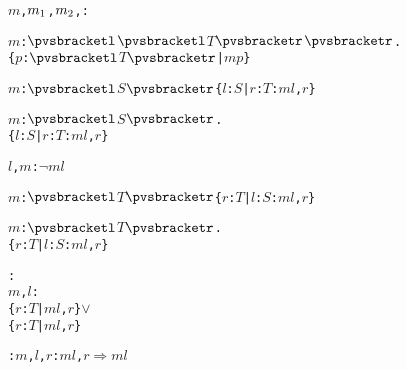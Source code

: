 \begin{alltt}
  \(m\), \(m\sb{1}\), \(m\sb{2}\), :  \vspace*{\pvsdeclspacing}

  \pvsid{(}\(m\)\pvsid{)}: \({\pvsbracketl}\)\({\pvsbracketl}\)\(T\)\({\pvsbracketr}\)\({\pvsbracketr}\). \pvskey{=}
      \{\(p\): \({\pvsbracketl}\)\(T\)\({\pvsbracketr}\) | \(m\)\pvsid{(}\(p\)\pvsid{)}\}\vspace*{\pvsdeclspacing}

  \pvsid{(}\(m\)\pvsid{)}: \({\pvsbracketl}\)\(S\)\({\pvsbracketr}\) \pvskey{=} \{\(l\): \(S\) |  \pvsid{(}\(r\): \(T\)\pvsid{)}: \(m\)\pvsid{(}\(l\), \(r\)\pvsid{)}\}\vspace*{\pvsdeclspacing}

  \pvsid{(}\(m\)\pvsid{)}: \({\pvsbracketl}\)\(S\)\({\pvsbracketr}\). \pvskey{=}
      \{\(l\): \(S\) |  \pvsid{(}\(r\): \(T\)\pvsid{)}: \(m\)\pvsid{(}\(l\), \(r\)\pvsid{)}\}\vspace*{\pvsdeclspacing}

  \pvsid{(}\(l\), \(m\)\pvsid{)}:  \pvskey{=} \(\neg\) \pvsid{(}\pvsid{(}\(m\)\pvsid{)}\pvsid{(}\(l\)\pvsid{)}\pvsid{)}\vspace*{\pvsdeclspacing}

  \pvsid{(}\(m\)\pvsid{)}: \({\pvsbracketl}\)\(T\)\({\pvsbracketr}\) \pvskey{=} \{\(r\): \(T\) |  \pvsid{(}\(l\): \(S\)\pvsid{)}: \(m\)\pvsid{(}\(l\), \(r\)\pvsid{)}\}\vspace*{\pvsdeclspacing}

  \pvsid{(}\(m\)\pvsid{)}: \({\pvsbracketl}\)\(T\)\({\pvsbracketr}\). \pvskey{=}
      \{\(r\): \(T\) |  \pvsid{(}\(l\): \(S\)\pvsid{)}: \(m\)\pvsid{(}\(l\), \(r\)\pvsid{)}\}\vspace*{\pvsdeclspacing}

  : 
     \pvsid{(}\(m\), \(l\)\pvsid{)}:
      \pvsid{(}\{\(r\): \(T\) | \(m\)\pvsid{(}\(l\), \(r\)\pvsid{)}\}\pvsid{)} \(\vee\)
       \pvsid{(}\{\(r\): \(T\) | \(m\)\pvsid{(}\(l\), \(r\)\pvsid{)}\}\pvsid{)}\vspace*{\pvsdeclspacing}

  :   \pvsid{(}\(m\), \(l\), \(r\)\pvsid{)}: \(m\)\pvsid{(}\(l\), \(r\)\pvsid{)} \(\Rightarrow\) \pvsid{(}\(m\)\pvsid{)}\pvsid{(}\(l\)\pvsid{)}\vspace*{\pvsdeclspacing}


\end{alltt}
